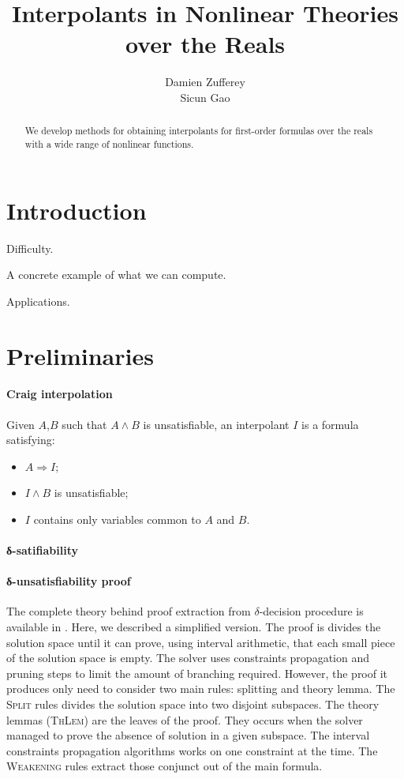 \documentclass{acm_proc_article-sp}
\begin{document}
\title{Interpolants in Nonlinear Theories over the Reals}
\author{
\alignauthor
Damien Zufferey\\
\alignauthor
Sicun Gao
}
\maketitle
\begin{abstract}
We develop methods for obtaining interpolants for first-order formulas over the reals with a wide range of nonlinear functions. 
\end{abstract}

\section{Introduction}

Difficulty. 

A concrete example of what we can compute. 

Applications. 

\section{Preliminaries}

\paragraph{Craig interpolation}
Given $A$,$B$ such that $A ∧ B$ is unsatisfiable, an interpolant $I$ is a formula satisfying:
\begin{itemize}
\item $A ⇒ I$;
\item $I ∧ B$ is unsatisfiable;
\item $I$ contains only variables common to $A$ and $B$.
\end{itemize}

\paragraph{δ-satifiability}

\paragraph{δ-unsatisfiability proof}

The complete theory behind proof extraction from $\delta$-decision procedure is available in \cite{}.
Here, we described a simplified version.
The proof is divides the solution space until it can prove, using interval arithmetic, that each small piece of the solution space is empty.
The solver uses constraints propagation and pruning steps to limit the amount of branching required.
However, the proof it produces only need to consider two main rules: splitting and theory lemma.
The \textsc{Split} rules divides the solution space into two disjoint subspaces.
The theory lemmas (\textsc{ThLem}) are the leaves of the proof.
They occurs when the solver managed to prove the absence of solution in a given subspace.
The interval constraints propagation algorithms works on one constraint at the time. 
The \textsc{Weakening} rules extract those conjunct out of the main formula.
\end{document}
